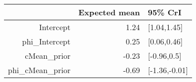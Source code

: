 \begin{tabular}{rrl}
  \hline
 & Expected mean & 95\% CrI \\ 
  \hline
Intercept & 1.24 & [1.04,1.45] \\ 
  phi\_Intercept & 0.25 & [0.06,0.46] \\ 
  cMean\_prior & -0.23 & [-0.96,0.5] \\ 
  phi\_cMean\_prior & -0.69 & [-1.36,-0.01] \\ 
   \hline
\end{tabular}

